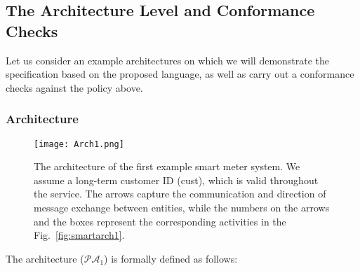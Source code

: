 \documentclass[a4paper]{article}
\begin{document}
\subsection{The Architecture Level and Conformance Checks} 
\label{arch:smartmeter}

Let us consider an example architectures on which we will demonstrate  the specification based on the proposed language, as well as carry out a conformance checks against the policy above.

\subsubsection{Architecture} 
\label{smartarch1} 

\begin{figure}[htb!]
    \begin{center}
        \texttt{[image: Arch1.png]}
    \end{center}
    \caption{The architecture of the first example smart meter system. We assume a long-term  customer ID (cust), which is valid throughout the service. The arrows capture the communication and direction of message exchange between entities, while the numbers on the arrows and the boxes represent the corresponding activities in the Fig.~\ref{fig:smartarch1}.}
    \label{fig:smartmeter1}
\end{figure}
 
The architecture ($\mathcal{P}\mathcal{A}_{1}$) is formally defined as follows:  
\end{document}

